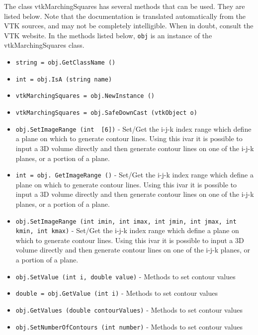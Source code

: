 The class vtkMarchingSquares has several methods that can be used.
  They are listed below.
Note that the documentation is translated automatically from the VTK sources,
and may not be completely intelligible.  When in doubt, consult the VTK website.
In the methods listed below, \verb|obj| is an instance of the vtkMarchingSquares class.
\begin{itemize}
\item  \verb|string = obj.GetClassName ()|

\item  \verb|int = obj.IsA (string name)|

\item  \verb|vtkMarchingSquares = obj.NewInstance ()|

\item  \verb|vtkMarchingSquares = obj.SafeDownCast (vtkObject o)|

\item  \verb|obj.SetImageRange (int  [6])| -  Set/Get the i-j-k index range which define a plane on which to generate 
 contour lines. Using this ivar it is possible to input a 3D volume
 directly and then generate contour lines on one of the i-j-k planes, or 
 a portion of a plane.

\item  \verb|int = obj. GetImageRange ()| -  Set/Get the i-j-k index range which define a plane on which to generate 
 contour lines. Using this ivar it is possible to input a 3D volume
 directly and then generate contour lines on one of the i-j-k planes, or 
 a portion of a plane.

\item  \verb|obj.SetImageRange (int imin, int imax, int jmin, int jmax, int kmin, int kmax)| -  Set/Get the i-j-k index range which define a plane on which to generate 
 contour lines. Using this ivar it is possible to input a 3D volume
 directly and then generate contour lines on one of the i-j-k planes, or 
 a portion of a plane.

\item  \verb|obj.SetValue (int i, double value)| -  Methods to set contour values

\item  \verb|double = obj.GetValue (int i)| -  Methods to set contour values

\item  \verb|obj.GetValues (double contourValues)| -  Methods to set contour values

\item  \verb|obj.SetNumberOfContours (int number)| -  Methods to set contour values


\end{itemize}
